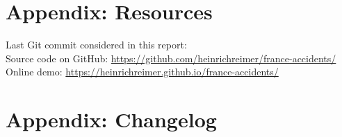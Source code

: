 \section*{Appendix: Resources}
Last Git commit considered in this report: \href{https://github.com/heinrichreimer/france-accidents/commits}{\texttt{\lastcommit}} \\
Source code on GitHub: \url{https://github.com/heinrichreimer/france-accidents/} \\
Online demo: \url{https://heinrichreimer.github.io/france-accidents/}

\section*{Appendix: Changelog}

